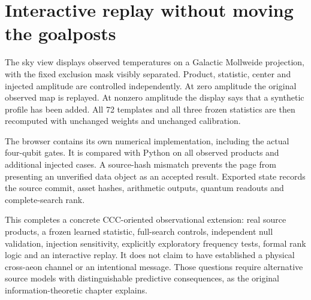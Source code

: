 \section{Interactive replay without moving the goalposts}

The sky view displays observed temperatures on a Galactic Mollweide projection, with the fixed exclusion mask visibly separated. Product, statistic, center and injected amplitude are controlled independently. At zero amplitude the original observed map is replayed. At nonzero amplitude the display says that a synthetic profile has been added. All 72 templates and all three frozen statistics are then recomputed with unchanged weights and unchanged calibration.

The browser contains its own numerical implementation, including the actual four-qubit gates. It is compared with Python on all observed products and additional injected cases. A source-hash mismatch prevents the page from presenting an unverified data object as an accepted result. Exported state records the source commit, asset hashes, arithmetic outputs, quantum readouts and complete-search rank.

This completes a concrete CCC-oriented observational extension: real source products, a frozen learned statistic, full-search controls, independent null validation, injection sensitivity, explicitly exploratory frequency tests, formal rank logic and an interactive replay. It does not claim to have established a physical cross-aeon channel or an intentional message. Those questions require alternative source models with distinguishable predictive consequences, as the original information-theoretic chapter explains.
